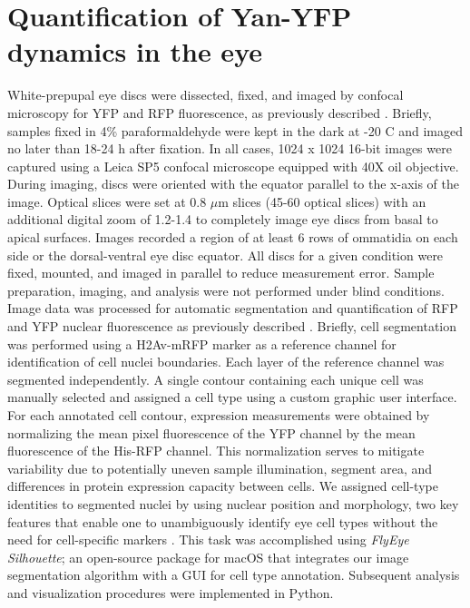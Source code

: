 \section{Quantification of Yan-YFP dynamics in the eye}
\label{appendix:metabolism:measurements:yan}

White-prepupal eye discs were dissected, fixed, and imaged by confocal microscopy for YFP and RFP fluorescence, as previously described \cite{Pelaez2015a}. Briefly, samples fixed in 4\% paraformaldehyde were kept in the dark at -20 \textdegree{}C and imaged no later than 18-24 h after fixation. In all cases, 1024 x 1024 16-bit images were captured using a Leica SP5 confocal microscope equipped with 40X oil objective. During imaging, discs were oriented with the equator parallel to the x-axis of the image. Optical slices were set at 0.8 $\mu$m slices (45-60 optical slices) with an additional digital zoom of 1.2-1.4 to completely image eye discs from basal to apical surfaces. Images recorded a region of at least 6 rows of ommatidia on each side or the dorsal-ventral eye disc equator. All discs for a given condition were fixed, mounted, and imaged in parallel to reduce measurement error. Sample preparation, imaging, and analysis were not performed under blind conditions. Image data was processed for automatic segmentation and quantification of RFP and YFP nuclear fluorescence as previously described \cite{Pelaez2015a}. Briefly, cell segmentation was performed using a H2Av-mRFP marker as a reference channel for identification of cell nuclei boundaries. Each layer of the reference channel was segmented independently. A single contour containing each unique cell was manually selected and assigned a cell type using a custom graphic user interface. For each annotated cell contour, expression measurements were obtained by normalizing the mean pixel fluorescence of the YFP channel by the mean fluorescence of the His-RFP channel. This normalization serves to mitigate variability due to potentially uneven sample illumination, segment area, and differences in protein expression capacity between cells. We assigned cell-type identities to segmented nuclei by using nuclear position and morphology, two key features that enable one to unambiguously identify eye cell types without the need for cell-specific markers \cite{Wolff1993}. This task was accomplished using \textit{FlyEye Silhouette}; an open-source package for macOS that integrates our image segmentation algorithm with a GUI for cell type annotation. Subsequent analysis and visualization procedures were implemented in Python.

